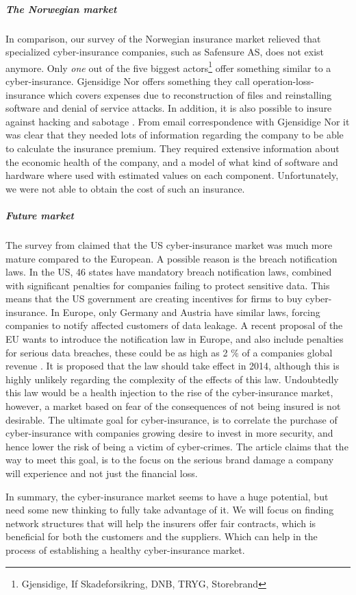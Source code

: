\subparagraph{The Norwegian market}

In comparison, our survey of the Norwegian insurance market relieved that specialized cyber-insurance companies, such as Safensure AS, does not exist anymore. Only \textit{one} out of the five biggest actors\footnote{Gjensidige, If Skadeforsikring, DNB, TRYG, Storebrand} offer something similar to a cyber-insurance. Gjensidige Nor offers something they call operation-loss-insurance which covers expenses due to reconstruction of files and reinstalling software and denial of service attacks. In addition, it is also possible to insure against hacking and sabotage \citep{gjensidige}. From email correspondence with Gjensidige Nor it was clear that they needed lots of information regarding the company to be able to calculate the insurance premium. They required extensive information about the economic health of the company, and a model of what kind of software and hardware where used with estimated values on each component. Unfortunately, we were not able to obtain the cost of such an insurance.
  
\subparagraph{Future market}
The survey from \cite{CFCunder} claimed that the US cyber-insurance market was much more mature compared to the European. A possible reason is the breach notification laws. In the US, 46 states have mandatory breach notification laws, combined with significant penalties for companies failing to protect sensitive data. This means that the US government are creating incentives for firms to buy cyber-insurance.
 In Europe, only Germany and Austria have similar laws, forcing companies to notify affected customers of data leakage. A recent proposal of the EU wants to introduce the notification law in Europe, and also include penalties for serious data breaches, these could be as high as 2 $\%$ of a companies global revenue \cite{CFCunder}. It is proposed that the law should take effect in 2014, although this is highly unlikely regarding the complexity of the effects of this law. Undoubtedly this law would be a health injection to the rise of the cyber-insurance market, however, a market based on fear of the consequences of not being insured is not desirable. The ultimate goal for cyber-insurance, is to correlate the purchase of cyber-insurance with companies growing desire to invest in more security, and hence lower the risk of being a victim of cyber-crimes. 
The article claims that the way to meet this goal, is to the focus on the serious brand damage a company will experience and not just the financial loss. 

In summary, the cyber-insurance market seems to have a huge potential, but need some new thinking to fully take advantage of it. We will focus on finding network structures that will help the insurers offer fair contracts, which is beneficial for both the customers and the suppliers. Which can help in the process of establishing a healthy cyber-insurance market.

   
   
   
   
   
   
   
  

